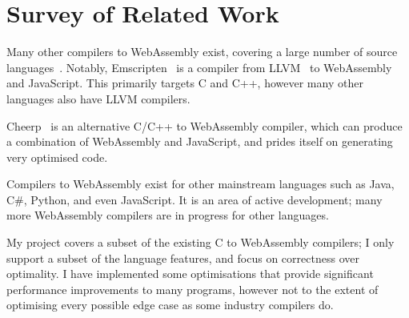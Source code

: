 \documentclass[00-main.tex]{subfiles}
\begin{document}
\section{Survey of Related Work}

Many other compilers to WebAssembly exist, covering a large number of source languages~.
Notably, Emscripten~ is a compiler from LLVM~ to WebAssembly and JavaScript.
This primarily targets C and C++, however many other languages also have LLVM compilers.

Cheerp~ is an alternative C/C++ to WebAssembly compiler, which can produce a combination of WebAssembly and JavaScript, and prides itself on generating very optimised code.

Compilers to WebAssembly exist for other mainstream languages such as Java, C\#, Python, and even JavaScript.
It is an area of active development; many more WebAssembly compilers are in progress for other languages.

My project covers a subset of the existing C to WebAssembly compilers; I only support a subset of the language features, and focus on correctness over optimality.
I have implemented some optimisations that provide significant performance improvements to many programs, however not to the extent of optimising every possible edge case as some industry compilers do.
\end{document}
